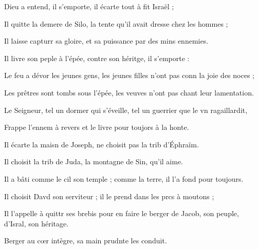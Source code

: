 \item Dieu a entend, il s’emporte,\psstar{} il écarte tout à fit Israël ;
\item Il quitte la demere de Silo,\psstar{} la tente qu’il avait dresse chez les hommes ;
\item Il laisse capturr sa gloire,\psstar{} et sa puissance par des mins ennemies.
\item Il livre son peple à l’épée,\psstar{} contre son héritge, il s’emporte :
\item Le feu a dévor les jeunes gens,\psstar{} les jeunes filles n’ont pas conn la joie des noces ;
\item Les prêtres sont tombs sous l’épée,\psstar{} les veuves n’ont pas chant leur lamentation.
\item Le Seigneur, tel un dormer qui s’éveille,\psstar{} tel un guerrier que le vn ragaillardit,
\item Frappe l’ennem à revers\psstar{} et le livre pour toujors à la honte.
\item Il écarte la maisn de Joseph,\psstar{} ne choisit pas la trib d’Éphraïm.
\item Il choisit la trib de Juda,\psstar{} la montagne de Sin, qu’il aime.
\item Il a bâti comme le cil son temple ;\psstar{} comme la terre, il l’a fond pour toujours.
\item Il choisit Davd son serviteur ;\psstar{} il le prend dans les prcs à moutons ;
\item Il l’appelle à quittr ses brebis\psstar{} pour en faire le berger de Jacob, son peuple, d’Isral, son héritage.
\item Berger au cœr intègre,\psstar{} sa main prudnte les conduit.